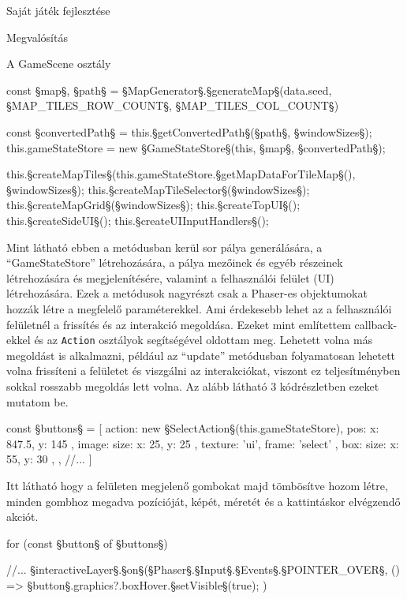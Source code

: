 \begin{MyChapter}{Saját játék fejlesztése}
\begin{MySection}{Megvalósítás}
\begin{MySubSection}{A GameScene osztály}
\begin{javascript}
{	const {§\color{jsConst}map§, §\color{jsConst}path§} = §\color{jsConst}MapGenerator§.§\color{jsMethod}generateMap§(data.seed, §\color{jsConst}MAP\_TILES\_ROW\_COUNT§, §\color{jsConst}MAP\_TILES\_COL\_COUNT§)
	
	const §\color{jsConst}convertedPath§ = this.§\color{jsMethod}getConvertedPath§(§\color{jsConst}path§, §\color{jsConst}windowSizes§);
	this.gameStateStore = new §\color{jsType}GameStateStore§(this, §\color{jsConst}map§, §\color{jsConst}convertedPath§);
	
	this.§\color{jsMethod}createMapTiles§(this.gameStateStore.§\color{jsMethod}getMapDataForTileMap§(), §\color{jsConst}windowSizes§);
	this.§\color{jsMethod}createMapTileSelector§(§\color{jsConst}windowSizes§);
	this.§\color{jsMethod}createMapGrid§(§\color{jsConst}windowSizes§);
	this.§\color{jsMethod}createTopUI§();
	this.§\color{jsMethod}createSideUI§();
	this.§\color{jsMethod}createUIInputHandlers§();
} 
			\end{javascript}
			Mint látható ebben a metódusban kerül sor pálya generálására, a ``GameStateStore'' létrehozására, a pálya mezőinek és egyéb részeinek létrehozására és megjelenítésére, valamint a felhasználói felület (UI) létrehozására. Ezek a metódusok nagyrészt csak a Phaser-es objektumokat hozzák létre a megfelelő paraméterekkel. Ami érdekesebb lehet az a felhasználói felületnél a frissítés és az interakció megoldása. Ezeket mint említettem callback-ekkel és az \texttt{Action} osztályok segítségével oldottam meg. Lehetett volna más megoldást is alkalmazni, például az ``update'' metódusban folyamatosan lehetett volna frissíteni a felületet és viszgálni az interakciókat, viszont ez teljesítményben sokkal rosszabb megoldás lett volna. Az alább látható 3 kódrészletben ezeket mutatom be.
			\begin{javascript}
const §\color{jsConst}buttons§ = [
	{
		action: new §\color{jsType}SelectAction§(this.gameStateStore),
		pos: { x: 847.5, y: 145 },
		image: { size: { x: 25, y: 25 }, texture: 'ui', frame: 'select' },
		box: { size: { x: 55, y: 30 }},
	},
	//...
]
			\end{javascript}
			Itt látható hogy a felületen megjelenő gombokat majd tömbösítve hozom létre, minden gombhoz megadva pozícióját, képét, méretét és a kattintáskor elvégzendő akciót.
			\begin{javascript}
for (const §\color{jsConst}button§ of §\color{jsConst}buttons§) {
	//...
	§\color{jsConst}interactiveLayer§.§\color{jsMethod}on§(§\color{jsType}Phaser§.§\color{jsType}Input§.§\color{jsType}Events§.§\color{jsConst}POINTER\_OVER§, () => {
		§\color{jsConst}button§.graphics?.boxHover.§\color{jsMethod}setVisible§(true);
	})
	
}
\end{javascript}
\end{MySubSection}
\end{MySection}
\end{MyChapter}
